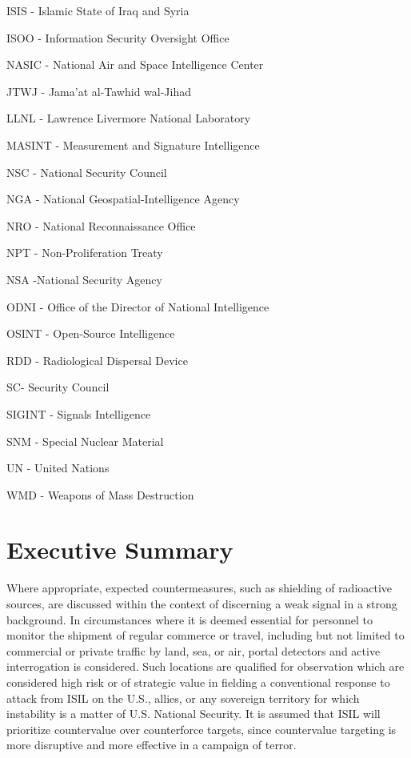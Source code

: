 \documentclass{report}
\begin{document}
ISIS - Islamic State of Iraq and Syria

ISOO - Information Security Oversight Office

NASIC - National Air and Space Intelligence Center 

JTWJ - Jama'at al-Tawhid wal-Jihad 

LLNL - Lawrence Livermore National Laboratory

MASINT - Measurement and Signature Intelligence 

NSC - National Security Council  

NGA - National Geospatial-Intelligence Agency 

NRO - National Reconnaissance Office

NPT - Non-Proliferation Treaty

NSA -National Security Agency

ODNI - Office of the Director of National Intelligence

OSINT - Open-Source Intelligence

RDD - Radiological Dispersal Device

SC- Security Council

SIGINT - Signals Intelligence 

SNM - Special Nuclear Material

UN - United Nations

WMD - Weapons of Mass Destruction

\newpage

\pagestyle{fancy2}


\chapter{Executive Summary}

Where appropriate, expected countermeasures, such as shielding of radioactive sources, are discussed within the context of discerning a weak signal in a strong background. In circumstances where it is deemed essential for personnel to monitor the shipment of regular commerce or travel, including but not limited to commercial or private traffic by land, sea, or air, portal detectors and active interrogation is considered. Such locations are qualified for observation which are considered high risk or of strategic value in fielding a conventional response to attack from ISIL on the U.S., allies, or any sovereign territory for which instability is a matter of U.S. National Security. It is assumed that ISIL will prioritize countervalue over counterforce targets, since countervalue targeting is more disruptive and more effective in a campaign of terror.
\end{document}
